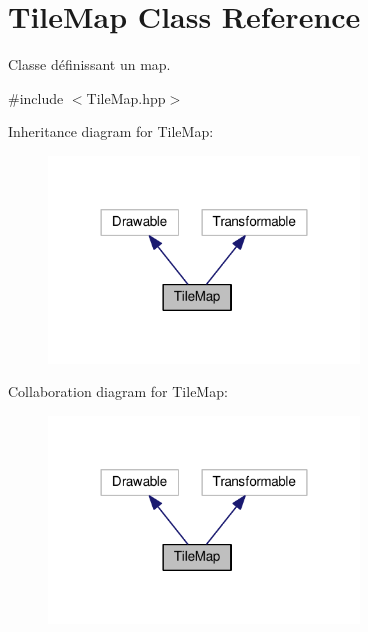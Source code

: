 \hypertarget{class_tile_map}{\section{Tile\+Map Class Reference}
\label{class_tile_map}
}


Classe définissant un map.  




{\ttfamily \#include $<$Tile\+Map.\+hpp$>$}



Inheritance diagram for Tile\+Map\+:
\nopagebreak
\begin{figure}[H]
\begin{center}
\leavevmode
\includegraphics[width=234pt]{class_tile_map__inherit__graph}
\end{center}
\end{figure}


Collaboration diagram for Tile\+Map\+:
\nopagebreak
\begin{figure}[H]
\begin{center}
\leavevmode
\includegraphics[width=234pt]{class_tile_map__coll__graph}
\end{center}
\end{figure}
